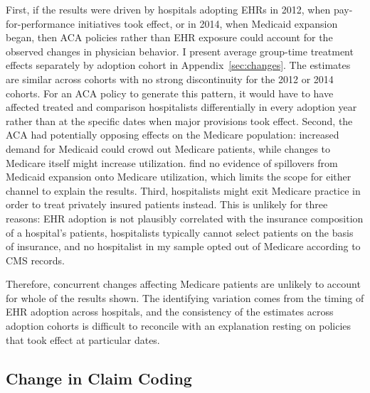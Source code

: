 \documentclass[12pt]{article}
\begin{document}
First, if the results were driven by hospitals adopting EHRs in 2012, when pay-for-performance initiatives took effect, or in 2014, when Medicaid expansion began, then ACA policies rather than EHR exposure could account for the observed changes in physician behavior. I present average group-time treatment effects separately by adoption cohort in Appendix~\ref{sec:changes}. The estimates are similar across cohorts with no
strong discontinuity for the 2012 or 2014 cohorts. For an ACA policy to generate this pattern, it would have to have affected treated and comparison hospitalists differentially in every adoption year rather than at the specific dates when major provisions took effect. Second, the ACA had potentially opposing effects on the Medicare population:
increased demand for Medicaid could crowd out Medicare patients, while changes to Medicare itself might increase utilization.
\citet{carey2020impact} find no evidence of spillovers from Medicaid expansion
onto Medicare utilization, which limits the scope for either channel to explain the results. Third, hospitalists might exit Medicare practice in order to treat privately insured patients instead. This is unlikely for three reasons: EHR adoption is not plausibly correlated with the insurance composition of a hospital's patients, hospitalists typically cannot select patients on the basis of insurance, and no hospitalist in my sample opted out of Medicare according to CMS records.

Therefore, concurrent changes affecting
Medicare patients are unlikely to account for whole of the results shown. The identifying variation comes from the timing of EHR adoption across hospitals, and the consistency of the estimates across adoption cohorts is difficult to reconcile with an explanation resting on policies that took effect at particular dates.

\subsection{Change in Claim Coding}\label{app:coding}
\end{document}

